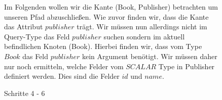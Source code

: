 \begin{figure}[htbp]
    \centering
    \begin{minipage}[t]{0.5\textwidth}
    \end{minipage}%
    \begin{minipage}[t]{0.5\textwidth}
        Im Folgenden wollen wir die Kante (Book, Publisher) betrachten um unseren Pfad abzuschließen.
        Wie zuvor finden wir, dass die Kante das Attribut $publisher$ trägt.
        Wir müssen nun allerdings nicht im Query-Type das Feld $publisher$ suchen sondern im aktuell befindlichen Knoten (Book).
        Hierbei finden wir, dass vom Type $Book$ das Feld $publisher$ kein Argument benötigt.
        Wir müssen daher nur noch ermitteln, welche Felder vom $SCALAR$ Type in Publisher definiert werden.
        Dies sind die Felder $id$ und $name$.
    \end{minipage}
    \caption{Schritte 4 - 6}
\end{figure}

